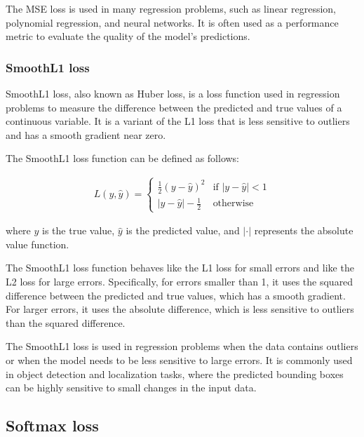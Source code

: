 The MSE loss is used in many regression problems, such as linear regression, polynomial regression, and neural networks. It is often used as a performance metric to evaluate the quality of the model's predictions.

\subsubsection{SmoothL1 loss}
\label{subsubsec:3_smoothL1_loss}

SmoothL1 loss, also known as Huber loss, is a loss function used in regression problems to measure the difference between the predicted and true values of a continuous variable. It is a variant of the L1 loss that is less sensitive to outliers and has a smooth gradient near zero.

The SmoothL1 loss function can be defined as follows:

\begin{equation}
\begin{split}
	L(y, \hat{y}) = \begin{cases}
		\frac{1}{2}(y - \hat{y})^2 & \text{if } |y - \hat{y}| < 1 \\
		|y - \hat{y}| - \frac{1}{2} & \text{otherwise} \
	\end{cases}
\end{split}
\end{equation}

where $y$ is the true value, $\hat{y}$ is the predicted value, and $|\cdot|$ represents the absolute value function.

The SmoothL1 loss function behaves like the L1 loss for small errors and like the L2 loss for large errors. Specifically, for errors smaller than 1, it uses the squared difference between the predicted and true values, which has a smooth gradient. For larger errors, it uses the absolute difference, which is less sensitive to outliers than the squared difference.

The SmoothL1 loss is used in regression problems when the data contains outliers or when the model needs to be less sensitive to large errors. It is commonly used in object detection and localization tasks, where the predicted bounding boxes can be highly sensitive to small changes in the input data.

\subsection{Softmax loss}
\label{subsec:3_softmax_loss}

